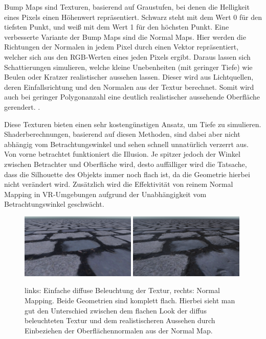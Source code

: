 Bump Maps sind Texturen, basierend auf Graustufen, bei denen die Helligkeit eines Pixels
einen Höhenwert repräsentiert. Schwarz steht mit dem Wert 0 für den tiefsten Punkt, und weiß mit dem Wert 1 für den höchsten Punkt.
Eine verbesserte Variante der Bump Maps sind die Normal Maps.
Hier werden die Richtungen der Normalen in jedem Pixel durch einen Vektor repräsentiert,
welcher sich aus den RGB-Werten eines jeden Pixels ergibt. Daraus lassen sich Schattierungen simulieren,
welche kleine Unebenheiten (mit geringer Tiefe) wie Beulen oder Kratzer realistischer aussehen lassen.
Dieser wird aus Lichtquellen, deren Einfallsrichtung und den Normalen aus der Textur berechnet.
Somit wird auch bei geringer Polygonanzahl eine deutlich realistischer aussehende Oberfläche gerendert.
\parencite{Cohen1998}.

Diese Texturen bieten einen sehr kostengünstigen
Ansatz, um Tiefe zu simulieren. Shaderberechnungen, basierend auf diesen Methoden, sind dabei aber nicht abhängig
vom Betrachtungswinkel und sehen schnell unnatürlich verzerrt aus.
Von vorne betrachtet funktioniert die Illusion. Je spitzer jedoch der Winkel zwischen Betrachter und
Oberfläche wird, desto auffälliger wird die Tatsache, dass die Silhouette des Objekts immer
noch flach ist, da die Geometrie hierbei nicht verändert wird.
Zusätzlich wird die Effektivität von reinem Normal Mapping in VR-Umgebungen aufgrund der Unabhängigkeit vom Betrachtungswinkel
geschwächt. 

\begin{figure}[h!t]
	\centering
	\includegraphics[width=0.49\textwidth]{Grafiken/Basics/Mapping/Vergleich_Diffuse.png}
	\includegraphics[width=0.49\textwidth]{Grafiken/Basics/Mapping/Vergleich_Normal.png}
	\begin{footnotesize}
		\caption{links: Einfache diffuse Beleuchtung der Textur, rechts: Normal Mapping. Beide Geometrien sind komplett flach. 
		Hierbei sieht man gut den Unterschied zwischen dem flachen Look
		der diffus beleuchteten Textur und dem realistischeren Aussehen durch Einbeziehen der Oberflächennormalen aus der Normal Map.}
	\end{footnotesize}
\end{figure}

